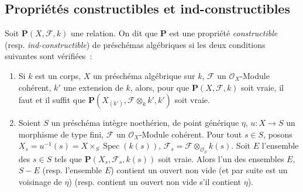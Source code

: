 \subsection{Propriétés constructibles et ind-constructibles}
\label{subsection:IV.9.2-fr}

\begin{definition}[9.2.1]
\label{IV.9.2.1-fr}
Soit $\mathbf P(X,\mathcal F,k)$ une relation. On dit que $\mathbf P$ est une
propriété \emph{constructible} (resp. \emph{ind-constructible}) de préschémas
algébriques si les deux conditions suivantes sont vérifiées~:
\begin{enumerate}[label=(\roman*)]
  \item Si $k$ est un corps, $X$ un préschéma algébrique sur $k$,
  $\mathcal F$ un $\mathcal O_X$-Module cohérent, $k'$ une extension de $k$,
  alors, pour que $\mathbf P(X,\mathcal F,k)$ soit vraie, il faut et il suffit
  que $\mathbf P(X_{(k')},\mathcal F\otimes_k k',k')$ soit vraie.
  \item Soient $S$ un préschéma intègre noethérien, de point générique $\eta$,
  $u:X\to S$ un morphisme de type fini, $\mathcal F$ un $\mathcal O_X$-Module
  cohérent. Pour tout $s\in S$, posons
  $X_s=u^{-1}(s)=X\times_S\operatorname{Spec}(k(s))$,
  $\mathcal F_s=\mathcal F\otimes_{\mathcal O_S}k(s)$. Soit $E$ l'ensemble
  des $s\in S$ tels que $\mathbf P(X_s,\mathcal F_s,k(s))$ soit vraie.
  Alors l'un des ensembles $E$, $S-E$ (resp. l'ensemble $E$) contient un
  ouvert non vide (et par suite est un voisinage de $\eta$) (resp. contient
  un ouvert non vide s'il contient $\eta$).
\end{enumerate}
\end{definition}

